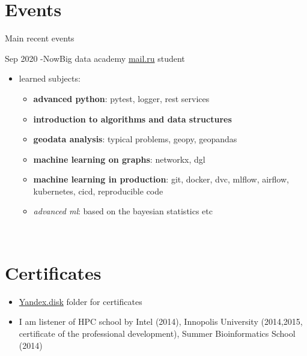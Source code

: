 \documentclass[letterpaper]{twentysecondcv} %
\begin{document}

\section{Events}

Main recent events

\begin{twenty}
        \twentyitem
        {Sep 2020 -}{Now}{Big data academy}
        {\href{http://data.mail.ru/}{mail.ru} }{student}
        {
            {\begin{itemize}
                \item learned subjects:
                    {\begin{itemize}
                    \item \textbf{advanced python}: pytest, logger, rest services
                    \item \textbf{introduction to algorithms and data structures}
                    \item \textbf{geodata analysis}: typical problems, geopy, geopandas
                    \item \textbf{machine learning on graphs}: networkx, dgl
                    \item \textbf{machine learning in production}: git, docker, dvc, mlflow, airflow, kubernetes, cicd, reproducible code
                    \item \emph{advanced ml}: based on the bayesian statistics etc
                    \end{itemize}}

            \end{itemize}}
        }
        \\
\end{twenty}



\section{Certificates}
    {\begin{itemize}
        \item \href{https://yadi.sk/d/aSyzcZ44-_l-8w?w=1}{Yandex.disk} folder for certificates
        \item I am listener of HPC school by Intel (2014), Innopolis University (2014,2015, certificate of the professional development),
        Summer Bioinformatics School (2014)
    \end{itemize}}
\end{document}
